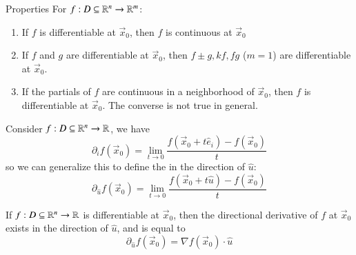 \documentclass[12pt]{report}
\begin{document}
\begin{appendices}
    \begin{rmk}{Properties}{}
        For $f:D \subseteq \mathbb R^n\rightarrow \mathbb R^m$: \begin{enumerate}
            \item If $f$ is differentiable at $\vec{x}_0$, then $f$ is continuous at $\vec{x}_0$
            \item If $f$ and $g$ are differentiable at $\vec{x}_0$, then $f\pm g, kf, fg$ ($m = 1$) are differentiable at $\vec{x}_0$.
            \item If the partials of $f$ are continuous in a neighborhood of $\vec{x}_0$, then $f$ is differentiable at $\vec{x}_0$. The converse is not true in general.
        \end{enumerate}
    \end{rmk}

    \begin{defn}{}{}
        Consider $f:D\subseteq \mathbb R^n\rightarrow \mathbb R$, we have \begin{equation}
            \partial_if(\vec{x}_0) = \lim_{t\rightarrow 0}\frac{f(\vec{x}_0+t\hat{e}_i) - f(\vec{x}_0)}{t}
        \end{equation}
        so we can generalize this to define the  in the direction of $\hat{u}$: \begin{equation}
            \partial_{\hat{u}}f(\vec{x}_0) = \lim_{t\rightarrow 0}\frac{f(\vec{x}_0+t\hat{u}) - f(\vec{x}_0)}{t}
        \end{equation}
    \end{defn}

    \begin{thm}{}{}
        If $f:D\subseteq \mathbb R^n\rightarrow \mathbb R$ is differentiable at $\vec{x}_0$, then the directional derivative of $f$ at $\vec{x}_0$ exists in the direction of $\hat{u}$, and is equal to \begin{equation}
            \partial_{\hat{u}}f(\vec{x}_0) = \nabla f(\vec{x}_0) \cdot \hat{u}
        \end{equation}
    \end{thm}



\end{appendices}
\end{document}
